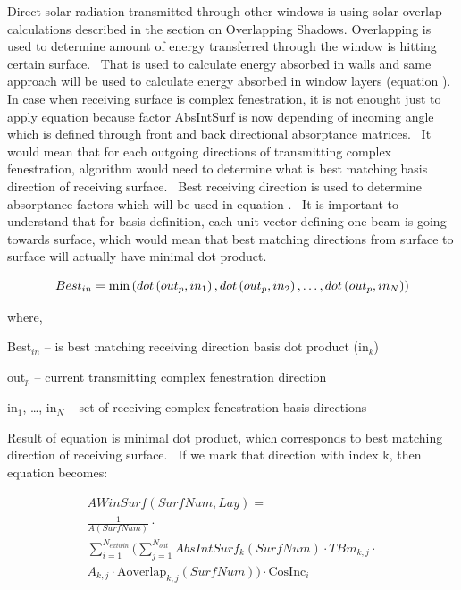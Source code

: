 Direct solar radiation transmitted through other windows is using solar overlap calculations described in the section on Overlapping Shadows. Overlapping is used to determine amount of energy transferred through the window is hitting certain surface.~ That is used to calculate energy absorbed in walls and same approach will be used to calculate energy absorbed in window layers (equation ).~ In case when receiving surface is complex fenestration, it is not enought just to apply equation because factor AbsIntSurf is now depending of incoming angle which is defined through front and back directional absorptance matrices.~ It would mean that for each outgoing directions of transmitting complex fenestration, algorithm would need to determine what is best matching basis direction of receiving surface.~ Best receiving direction is used to determine absorptance factors which will be used in equation .~ It is important to understand that for basis definition, each unit vector defining one beam is going towards surface, which would mean that best matching directions from surface to surface will actually have minimal dot product.

\begin{equation}
Bes{t_{in}} = {\rm{min}}\left( {dot\left( {ou{t_p},i{n_1}} \right),dot\left( {ou{t_p},i{n_2}} \right), \ldots ,dot\left( {ou{t_p},i{n_N}} \right)} \right)
\end{equation}

where,

Best\(_{in}\) -- is best matching receiving direction basis dot product (in\(_{k}\))

out\(_{p}\) -- current transmitting complex fenestration direction

in\(_{1}\), \ldots{}, in\(_{N}\) -- set of receiving complex fenestration basis directions

Result of equation is minimal dot product, which corresponds to best matching direction of receiving surface.~ If we mark that direction with index k, then equation becomes:

\begin{equation}
  \begin{array}{l}
    AWinSurf(SurfNum,Lay) = \\
      \frac{1}{A(SurfNum)} \cdot \\
      \sum_{i = 1}^{N_{extwin}} (\sum\limits_{j = 1}^{N_{out}} AbsIntSur{f_k}(SurfNum) \cdot TB{m_{k,j}} \cdot \\
      A_{k,j} \cdot \text{Aoverlap}_{k,j}(SurfNum)) \cdot \text{CosInc}_i
  \end{array}
\end{equation}

